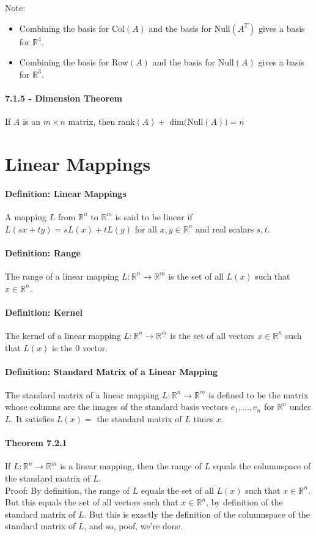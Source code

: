\documentclass[10pt,letter]{article}
\begin{document}
Note: \begin{itemize} 
\item Combining the basis for Col$(A)$ and the basis for Null$(A^T)$ gives a basis for $\mathbb{R}^4$. 
\item Combining the basis for Row$(A)$ and the basis for Null$(A)$ gives a basis for $\mathbb{R}^3$. 
\end{itemize}

\paragraph{7.1.5 - Dimension Theorem} If $A$ is an $m\times n$ matrix, then rank$(A)+$ dim$($Null$(A))=n$

\section*{Linear Mappings}
\paragraph{Definition: Linear Mappings} A mapping $L$ from $\mathbb{R}^n$ to $\mathbb{R}^m$ is said to be linear if $L(sx+ty)=sL(x)+tL(y)$ for all $x,y\in\mathbb{R}^n$ and real scalars $s,t$. 
\paragraph{Definition: Range} The range of a linear mapping $L:\mathbb{R}^n\rightarrow\mathbb{R}^m$ is the set of all $L(x)$ such that $x\in\mathbb{R}^n$. 
\paragraph{Definition: Kernel} The kernel of a linear mapping $L:\mathbb{R}^n\rightarrow\mathbb{R}^m$ is the set of all vectors $x\in\mathbb{R}^n$ such that $L(x)$ is the $0$ vector. 
\paragraph{Definition: Standard Matrix of a Linear Mapping} The standard matrix of a linear mapping $L:\mathbb{R}^n\rightarrow\mathbb{R}^m$ is defined to be the matrix whose columns are the images of the standard basis vectors $e_1,\ldots,e_n$ for $\mathbb{R}^n$ under $L$. It satisfies $L(x)=$ the standard matrix of $L$ times $x$. 
\paragraph{Theorem 7.2.1} If $L:\mathbb{R}^n\rightarrow\mathbb{R}^m$ is a linear mapping, then the range of $L$ equals the columnspace of the standard matrix of $L$. \\ 
Proof: By definition, the range of $L$ equals the set of all $L(x)$ such that $x\in\mathbb{R}^n$. But this equals the set of all vectors such that $x\in\mathbb{R}^n$, by definition of the standard matrix of $L$. But this is exactly the definition of the columnspace of the standard matrix of $L$, and so, poof, we're done. 
\end{document}
